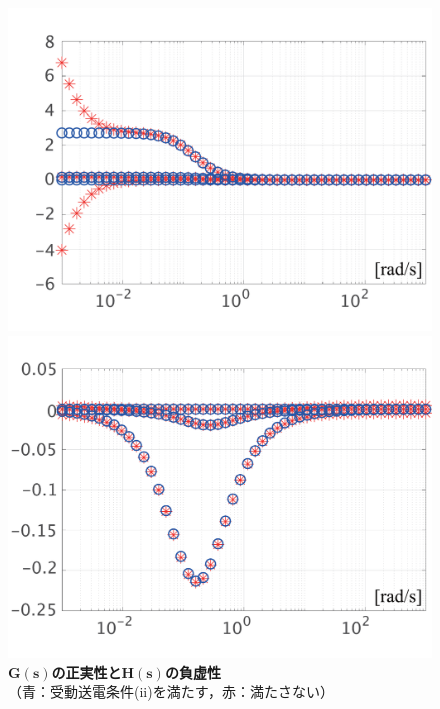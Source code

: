 \documentclass[tombow,dvipdfmx]{corona-a5-1.1}
\begin{document}
\begin{figure}[t]
  \centering
  {
  \begin{minipage}{0.49\linewidth}
    \centering
    \includegraphics[width = 1.0\linewidth]{figs/eigG}
    \medskip
  \end{minipage}
  \begin{minipage}{0.49\linewidth}
    \centering
    \includegraphics[width = 1.0\linewidth]{figs/eigH}
    \medskip
  \end{minipage}
  }
  \medskip
  \caption{\textbf{$\bm{G(s)}$の正実性と$\bm{H(s)}$の負虚性}
  \\  \centering（青：受動送電条件(ii)を満たす，赤：満たさない）}
  \label{fig:eigGH}
\medskip
\end{figure}
\end{document}
